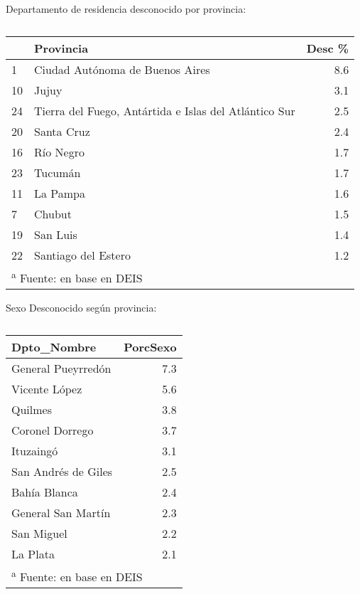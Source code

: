 \documentclass[10pt,ignorenonframetext,]{beamer}
\begin{document}
\begin{frame}

Departamento de residencia desconocido por provincia:

\begin{table}[t]

\caption{\label{tab:SinDEP}}
\centering
\begin{tabular}{l|l|r}
\hline
  & Provincia & Desc \%\\
\hline
1 & Ciudad Autónoma de Buenos Aires & 8.6\\
\hline
10 & Jujuy & 3.1\\
\hline
24 & Tierra del Fuego, Antártida e Islas del Atlántico Sur & 2.5\\
\hline
20 & Santa Cruz & 2.4\\
\hline
16 & Río Negro & 1.7\\
\hline
23 & Tucumán & 1.7\\
\hline
11 & La Pampa & 1.6\\
\hline
7 & Chubut & 1.5\\
\hline
19 & San Luis & 1.4\\
\hline
22 & Santiago del Estero & 1.2\\
\hline
\multicolumn{3}{l}{\textsuperscript{a} Fuente: en base en DEIS}\\
\end{tabular}
\end{table}

\end{frame}

\begin{frame}

Sexo Desconocido según provincia:

\begin{table}[t]

\caption{\label{tab:UnkSexAge}}
\centering
\begin{tabular}{l|r}
\hline
Dpto\_Nombre & PorcSexo\\
\hline
General Pueyrredón & 7.3\\
\hline
Vicente López & 5.6\\
\hline
Quilmes & 3.8\\
\hline
Coronel Dorrego & 3.7\\
\hline
Ituzaingó & 3.1\\
\hline
San Andrés de Giles & 2.5\\
\hline
Bahía Blanca & 2.4\\
\hline
General San Martín & 2.3\\
\hline
San Miguel & 2.2\\
\hline
La Plata & 2.1\\
\hline
\multicolumn{2}{l}{\textsuperscript{a} Fuente: en base en DEIS}\\
\end{tabular}
\end{table}

\end{frame}
\end{document}
